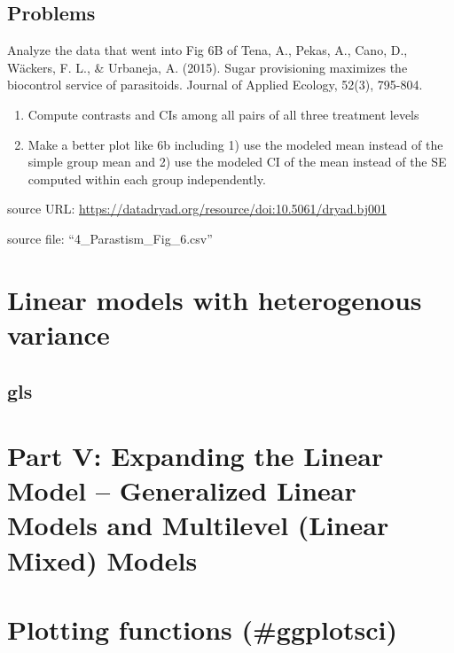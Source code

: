 \documentclass[]{book}
\providecommand{\tightlist}{%
  \setlength{\itemsep}{0pt}\setlength{\parskip}{0pt}}
\begin{document}
\hypertarget{problems-2}{%
\section{Problems}\label{problems-2}}

Analyze the data that went into Fig 6B of Tena, A., Pekas, A., Cano, D., Wäckers, F. L., \& Urbaneja, A. (2015). Sugar provisioning maximizes the biocontrol service of parasitoids. Journal of Applied Ecology, 52(3), 795-804.

\begin{enumerate}
\def\labelenumi{\arabic{enumi}.}
\tightlist
\item
  Compute contrasts and CIs among all pairs of all three treatment levels
\item
  Make a better plot like 6b including 1) use the modeled mean instead of the simple group mean and 2) use the modeled CI of the mean instead of the SE computed within each group independently.
\end{enumerate}

source URL: \url{https://datadryad.org/resource/doi:10.5061/dryad.bj001}

source file: ``4\_Parastism\_Fig\_6.csv''

\hypertarget{linear-models-with-heterogenous-variance}{%
\chapter{Linear models with heterogenous variance}\label{linear-models-with-heterogenous-variance}}

\hypertarget{gls}{%
\section{gls}\label{gls}}

\hypertarget{part-v-expanding-the-linear-model-generalized-linear-models-and-multilevel-linear-mixed-models}{%
\chapter*{Part V: Expanding the Linear Model -- Generalized Linear Models and Multilevel (Linear Mixed) Models}\label{part-v-expanding-the-linear-model-generalized-linear-models-and-multilevel-linear-mixed-models}}

\hypertarget{plotting-functions-ggplotsci}{%
\chapter{Plotting functions (\#ggplotsci)}\label{plotting-functions-ggplotsci}}
\end{document}
